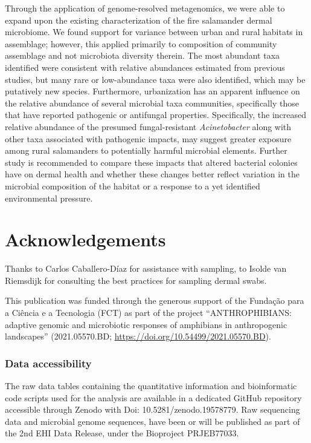\documentclass[
  12pt,
]{article}
\begin{document}
Through the application of genome-resolved metagenomics, we were able to
expand upon the existing characterization of the fire salamander dermal
microbiome. We found support for variance between urban and rural
habitats in assemblage; however, this applied primarily to composition
of community assemblage and not microbiota diversity therein. The most
abundant taxa identified were consistent with relative abundances
estimated from previous studies, but many rare or low-abundance taxa
were also identified, which may be putatively new species. Furthermore,
urbanization has an apparent influence on the relative abundance of
several microbial taxa communities, specifically those that have
reported pathogenic or antifungal properties. Specifically, the
increased relative abundance of the presumed fungal-resistant
\emph{Acinetobacter} along with other taxa associated with pathogenic
impacts, may suggest greater exposure among rural salamanders to
potentially harmful microbial elements. Further study is recommended to
compare these impacts that altered bacterial colonies have on dermal
health and whether these changes better reflect variation in the
microbial composition of the habitat or a response to a yet identified
environmental pressure.

\newpage

\section{Acknowledgements}\label{acknowledgements}

Thanks to Carlos Caballero-Díaz for assistance with sampling, to Isolde
van Riemsdijk for consulting the best practices for sampling dermal
swabs.

This publication was funded through the generous support of the Fundação
para a Ciência e a Tecnologia (FCT) as part of the project
``ANTHROPHIBIANS: adaptive genomic and microbiotic responses of
amphibians in anthropogenic landscapes'' (2021.05570.BD;
\url{https://doi.org/10.54499/2021.05570.BD}).

\subsubsection{Data accessibility}\label{data-accessibility}

The raw data tables containing the quantitative information and
bioinformatic code scripts used for the analysis are available in a
dedicated GitHub repository accessible through Zenodo with Doi:
10.5281/zenodo.19578779. Raw sequencing data and microbial genome
sequences, have been or will be published as part of the 2nd EHI Data
Release, under the Bioproject PRJEB77033.
\end{document}
